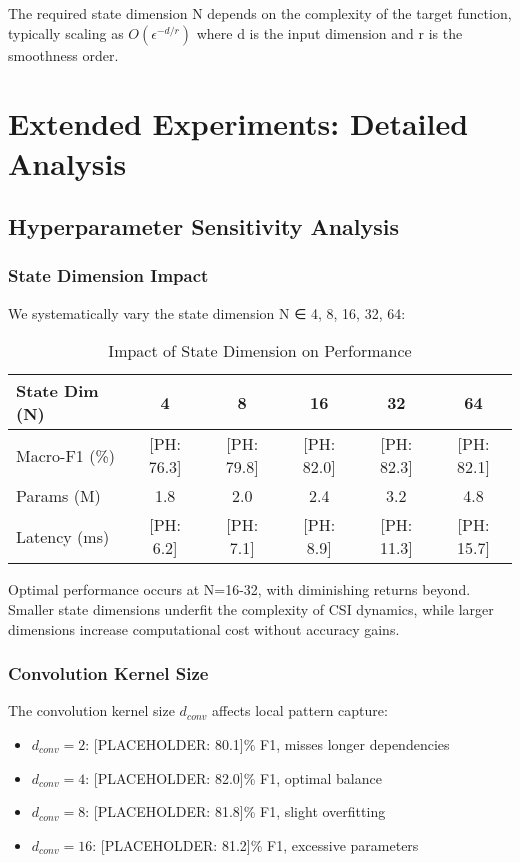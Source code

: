 \documentclass[journal]{IEEEtran}
\begin{document}
The required state dimension N depends on the complexity of the target function, typically scaling as $O(\epsilon^{-d/r})$ where d is the input dimension and r is the smoothness order.

\section{Extended Experiments: Detailed Analysis}

\subsection{Hyperparameter Sensitivity Analysis}

\subsubsection{State Dimension Impact}
We systematically vary the state dimension N ∈ {4, 8, 16, 32, 64}:

\begin{table}[h]
\centering
\caption{Impact of State Dimension on Performance}
\begin{tabular}{lccccc}
\toprule
State Dim (N) & 4 & 8 & 16 & 32 & 64 \\
\midrule
Macro-F1 (\%) & [PH: 76.3] & [PH: 79.8] & [PH: 82.0] & [PH: 82.3] & [PH: 82.1] \\
Params (M) & 1.8 & 2.0 & 2.4 & 3.2 & 4.8 \\
Latency (ms) & [PH: 6.2] & [PH: 7.1] & [PH: 8.9] & [PH: 11.3] & [PH: 15.7] \\
\bottomrule
\end{tabular}
\end{table}

Optimal performance occurs at N=16-32, with diminishing returns beyond. Smaller state dimensions underfit the complexity of CSI dynamics, while larger dimensions increase computational cost without accuracy gains.

\subsubsection{Convolution Kernel Size}
The convolution kernel size $d_{conv}$ affects local pattern capture:

\begin{itemize}
\item $d_{conv}=2$: [PLACEHOLDER: 80.1]\% F1, misses longer dependencies
\item $d_{conv}=4$: [PLACEHOLDER: 82.0]\% F1, optimal balance
\item $d_{conv}=8$: [PLACEHOLDER: 81.8]\% F1, slight overfitting
\item $d_{conv}=16$: [PLACEHOLDER: 81.2]\% F1, excessive parameters
\end{itemize}
\end{document}
